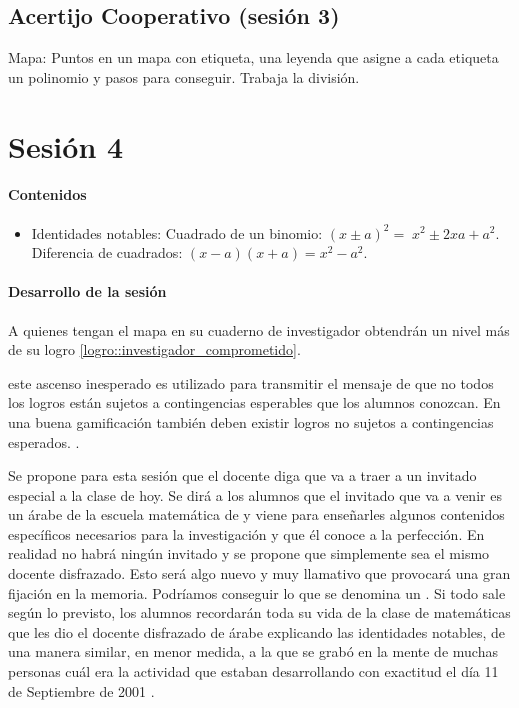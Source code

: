 \subsection{Acertijo Cooperativo (sesión 3)}
\label{app:ses3:coop}


Mapa: Puntos en un mapa con etiqueta, una leyenda que asigne a cada etiqueta un polinomio y pasos para conseguir.
%
Trabaja la división.





\section{Sesión 4}


\paragraph{Contenidos}
\begin{itemize}
	\item Identidades notables: 
	\subitem Cuadrado de un binomio: $(x\pm a)^2 = \;x^2\pm 2xa + a^2$.
	\subitem Diferencia de cuadrados: $(x-a)(x+a) = x^2-a^2$.
\end{itemize}

\paragraph{Desarrollo de la sesión}

A quienes tengan el mapa en su cuaderno de investigador obtendrán un nivel más de su logro \ref{logro::investigador_comprometido}.

\Justificacion{} este ascenso inesperado es utilizado para transmitir el mensaje de que no todos los logros están sujetos a contingencias esperables que los alumnos conozcan.
%
En una buena gamificación también deben existir logros no sujetos a contingencias esperados. \citep{werbach2012win}.

Se propone para esta sesión que el docente diga que va a traer a un invitado especial a la clase de hoy.
%
Se dirá a los alumnos que el invitado que va a venir es un árabe de la escuela matemática de \arab y viene para enseñarles algunos contenidos específicos necesarios para la investigación y que él conoce a la perfección.
%
En realidad no habrá ningún invitado y se propone que simplemente sea el mismo docente disfrazado.
%
Esto será algo nuevo y muy llamativo que provocará una gran fijación en la memoria.
%
Podríamos conseguir lo que se denomina un .
Si todo sale según lo previsto, los alumnos recordarán toda su vida de la clase de matemáticas que les dio el docente disfrazado de árabe explicando las identidades notables, 
%
de una manera similar, en menor medida, a la que se grabó en la mente de muchas personas cuál era la actividad que estaban desarrollando con exactitud el día 11 de Septiembre de 2001 \citep{11s}.

